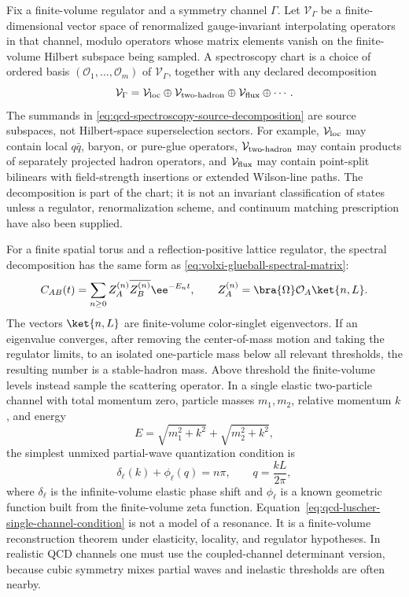 \begin{definition}
\label{def:qcd-operator-sector-spectroscopy-chart}
Fix a finite-volume regulator and a symmetry channel \(\Gamma\).  Let
\(\mathcal V_\Gamma\) be a finite-dimensional vector space of renormalized
gauge-invariant interpolating operators in that channel, modulo operators
whose matrix elements vanish on the finite-volume Hilbert subspace being
sampled.  A spectroscopy chart is a choice of ordered basis
\((\mathcal O_1,\ldots,\mathcal O_m)\) of \(\mathcal V_\Gamma\), together
with any declared decomposition
\begin{equation}
  \mathcal V_\Gamma
  =
  \mathcal V_{\rm loc}\oplus
  \mathcal V_{\rm two\text{-}hadron}\oplus
  \mathcal V_{\rm flux}\oplus\cdots .
  \label{eq:qcd-spectroscopy-source-decomposition}
\end{equation}
The summands in \eqref{eq:qcd-spectroscopy-source-decomposition} are source
subspaces, not Hilbert-space superselection sectors.  For example,
\(\mathcal V_{\rm loc}\) may contain local \(q\bar q\), baryon, or pure-glue
operators, \(\mathcal V_{\rm two\text{-}hadron}\) may contain products of
separately projected hadron operators, and \(\mathcal V_{\rm flux}\) may
contain point-split bilinears with field-strength insertions or extended
Wilson-line paths.  The decomposition is part of the chart; it is not an
invariant classification of states unless a regulator, renormalization
scheme, and continuum matching prescription have also been supplied.
\end{definition}

For a finite spatial torus and a reflection-positive lattice regulator, the
spectral decomposition has the same form as
\eqref{eq:volxi-glueball-spectral-matrix}:
\[
  C_{AB}(t)=
  \sum_{n\ge0}Z_A^{(n)}\overline{Z_B^{(n)}}\ee^{-E_n t},
  \qquad
  Z_A^{(n)}=\bra{\Omega}\mathcal O_A\ket{n,L}.
\]
The vectors \(\ket{n,L}\) are finite-volume color-singlet eigenvectors.  If
an eigenvalue converges, after removing the center-of-mass motion and taking
the regulator limits, to an isolated one-particle mass below all relevant
thresholds, the resulting number is a stable-hadron mass.  Above threshold the
finite-volume levels instead sample the scattering operator.  In a single
elastic two-particle channel with total momentum zero, particle masses
\(m_1,m_2\), relative momentum \(k\), and energy
\[
  E=\sqrt{m_1^2+k^2}+\sqrt{m_2^2+k^2},
\]
the simplest unmixed partial-wave quantization condition is
\begin{equation}
  \delta_\ell(k)+\phi_{\ell}(q)=n\pi,
  \qquad
  q=\frac{kL}{2\pi},
  \label{eq:qcd-luscher-single-channel-condition}
\end{equation}
where \(\delta_\ell\) is the infinite-volume elastic phase shift and
\(\phi_\ell\) is a known geometric function built from the finite-volume zeta
function.  Equation~\eqref{eq:qcd-luscher-single-channel-condition} is not a
model of a resonance.  It is a finite-volume reconstruction theorem under
elasticity, locality, and regulator hypotheses.  In realistic QCD channels
one must use the coupled-channel determinant version, because cubic symmetry
mixes partial waves and inelastic thresholds are often nearby.


